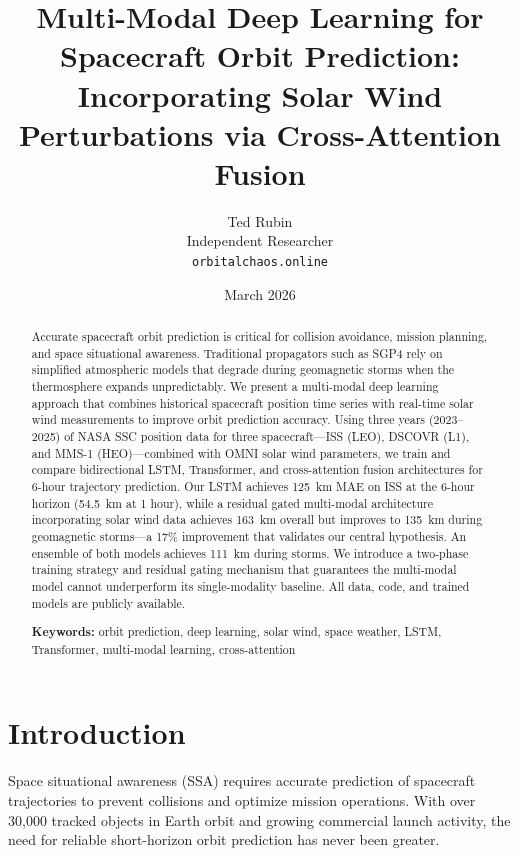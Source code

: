 \documentclass[twocolumn]{article}
\title{Multi-Modal Deep Learning for Spacecraft Orbit Prediction:\\
  Incorporating Solar Wind Perturbations via Cross-Attention Fusion}
\author{
  Ted Rubin \\
  Independent Researcher \\
  \texttt{orbitalchaos.online}
}
\date{March 2026}
\begin{document}
\maketitle

\begin{abstract}
Accurate spacecraft orbit prediction is critical for collision avoidance,
mission planning, and space situational awareness. Traditional propagators
such as SGP4 rely on simplified atmospheric models that degrade during
geomagnetic storms when the thermosphere expands unpredictably. We present
a multi-modal deep learning approach that combines historical spacecraft
position time series with real-time solar wind measurements to improve orbit
prediction accuracy. Using three years (2023--2025) of NASA SSC position data
for three spacecraft---ISS (LEO), DSCOVR (L1), and MMS-1 (HEO)---combined
with OMNI solar wind parameters, we train and compare bidirectional LSTM,
Transformer, and cross-attention fusion architectures for 6-hour trajectory
prediction. Our LSTM achieves 125~km MAE on ISS at the 6-hour horizon (54.5~km
at 1 hour), while a residual gated multi-modal architecture incorporating
solar wind data achieves 163~km overall but improves to 135~km during
geomagnetic storms---a 17\% improvement that validates our central hypothesis.
An ensemble of both models achieves 111~km during storms. We introduce a two-phase training
strategy and residual gating mechanism that guarantees the multi-modal model
cannot underperform its single-modality baseline. All data, code, and trained
models are publicly available.

\bigskip
\noindent\textbf{Keywords:} orbit prediction, deep learning, solar wind,
space weather, LSTM, Transformer, multi-modal learning, cross-attention
\end{abstract}

\section{Introduction}
\label{sec:intro}

Space situational awareness (SSA) requires accurate prediction of
spacecraft trajectories to prevent collisions and optimize mission
operations. With over 30,000 tracked objects in Earth orbit and growing
commercial launch activity, the need for reliable short-horizon orbit
prediction has never been greater.
\end{document}
